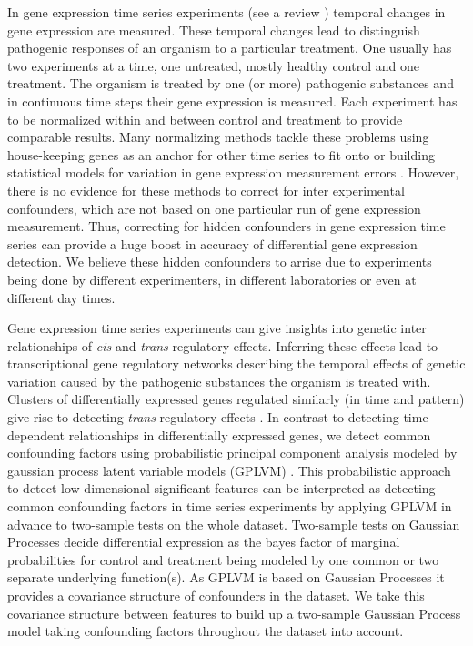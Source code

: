 \documentclass[11pt,a4paper,titlepage,twoside,tablecaptionabove]{article}
\begin{document}
In gene expression time series experiments (see a review
\cite{bar2004analyzing}) temporal changes in gene expression are
measured. These temporal changes lead to distinguish pathogenic
responses of an organism to a particular treatment. One usually has
two experiments at a time, one untreated, mostly healthy control and
one treatment. The organism is treated by one (or more) pathogenic
substances and in continuous time steps their gene expression is
measured. Each experiment has to be normalized within and between
control and treatment to provide comparable results. Many normalizing
methods tackle these problems using house-keeping genes as an anchor
for other time series to fit onto
\cite{vandesompele2002accurate,aach2001aligning} or building
statistical models for variation in gene expression measurement errors
\cite{rocke2001model}. However, there is no evidence for these methods
to correct for inter experimental confounders, which are not based on
one particular run of gene expression measurement. Thus, correcting
for hidden confounders in gene expression time series can provide a
huge boost in accuracy of differential gene expression detection. We
believe these hidden confounders to arrise due to experiments being
done by different experimenters, in different laboratories or even at
different day times.

Gene expression time series experiments can give insights into genetic
inter relationships of {\it cis} and {\it trans} regulatory
effects. Inferring these effects lead to transcriptional gene
regulatory networks describing the temporal effects of genetic
variation caused by the pathogenic substances the organism is treated
with. Clusters of differentially expressed genes regulated similarly
(in time and pattern) give rise to detecting {\it trans} regulatory
effects \cite{stegle2010robust}. In contrast to detecting time
dependent relationships in differentially expressed genes, we detect
common confounding factors using probabilistic principal component
analysis modeled by gaussian process latent variable models (GPLVM)
\cite{lawrence2004gaussian}. This probabilistic approach to detect low
dimensional significant features can be interpreted as detecting
common confounding factors in time series experiments by applying
GPLVM in advance to two-sample tests \cite{stegle2010robust} on the
whole dataset. Two-sample tests on Gaussian Processes decide
differential expression as the bayes factor of marginal probabilities
for control and treatment being modeled by one common or two separate
underlying function(s). As GPLVM is based on Gaussian Processes it
provides a covariance structure of confounders in the dataset. We take
this covariance structure between features to build up a two-sample
Gaussian Process model taking confounding factors throughout the
dataset into account.
\end{document}
